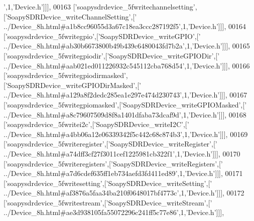 \begin{DoxyCode}
{      '},1,\textcolor{stringliteral}{'Device.h'}]]],
00163   [\textcolor{stringliteral}{'soapysdrdevice\_5fwritechannelsetting'},[\textcolor{stringliteral}{'SoapySDRDevice\_writeChannelSetting'},[\textcolor{stringliteral}{'
      ../Device\_8h.html#a1b8cc96055d3a67c18ea3ccc287192f5'},1,\textcolor{stringliteral}{'Device.h'}]]],
00164   [\textcolor{stringliteral}{'soapysdrdevice\_5fwritegpio'},[\textcolor{stringliteral}{'SoapySDRDevice\_writeGPIO'},[\textcolor{stringliteral}{'
      ../Device\_8h.html#ab30b6673800b49b439c6480043fd7b2a'},1,\textcolor{stringliteral}{'Device.h'}]]],
00165   [\textcolor{stringliteral}{'soapysdrdevice\_5fwritegpiodir'},[\textcolor{stringliteral}{'SoapySDRDevice\_writeGPIODir'},[\textcolor{stringliteral}{'
      ../Device\_8h.html#aab021ed011226932c545112cba768d54'},1,\textcolor{stringliteral}{'Device.h'}]]],
00166   [\textcolor{stringliteral}{'soapysdrdevice\_5fwritegpiodirmasked'},[\textcolor{stringliteral}{'SoapySDRDevice\_writeGPIODirMasked'},[\textcolor{stringliteral}{'
      ../Device\_8h.html#a129a8f2dedc285ea1e297e474d230743'},1,\textcolor{stringliteral}{'Device.h'}]]],
00167   [\textcolor{stringliteral}{'soapysdrdevice\_5fwritegpiomasked'},[\textcolor{stringliteral}{'SoapySDRDevice\_writeGPIOMasked'},[\textcolor{stringliteral}{'
      ../Device\_8h.html#a8c79607509d8f8a1401dfaba73dcaf9d'},1,\textcolor{stringliteral}{'Device.h'}]]],
00168   [\textcolor{stringliteral}{'soapysdrdevice\_5fwritei2c'},[\textcolor{stringliteral}{'SoapySDRDevice\_writeI2C'},[\textcolor{stringliteral}{'
      ../Device\_8h.html#a4bb06a12e06339342f5c442c68c874b3'},1,\textcolor{stringliteral}{'Device.h'}]]],
00169   [\textcolor{stringliteral}{'soapysdrdevice\_5fwriteregister'},[\textcolor{stringliteral}{'SoapySDRDevice\_writeRegister'},[\textcolor{stringliteral}{'
      ../Device\_8h.html#a74dff3cf27f3011cef1225981cb322f1'},1,\textcolor{stringliteral}{'Device.h'}]]],
00170   [\textcolor{stringliteral}{'soapysdrdevice\_5fwriteregisters'},[\textcolor{stringliteral}{'SoapySDRDevice\_writeRegisters'},[\textcolor{stringliteral}{'
      ../Device\_8h.html#a7d6cdef635ff1eb734aefd3fd411ed89'},1,\textcolor{stringliteral}{'Device.h'}]]],
00171   [\textcolor{stringliteral}{'soapysdrdevice\_5fwritesetting'},[\textcolor{stringliteral}{'SoapySDRDevice\_writeSetting'},[\textcolor{stringliteral}{'
      ../Device\_8h.html#af3876a5faa34ba210f0648017bf4773c'},1,\textcolor{stringliteral}{'Device.h'}]]],
00172   [\textcolor{stringliteral}{'soapysdrdevice\_5fwritestream'},[\textcolor{stringliteral}{'SoapySDRDevice\_writeStream'},[\textcolor{stringliteral}{'
      ../Device\_8h.html#ae3d938105fa55072296c241ff5c77e86'},1,\textcolor{stringliteral}{'Device.h'}]]],

\end{DoxyCode}
